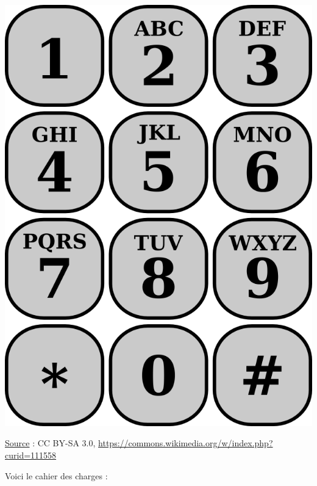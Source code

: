 \documentclass[a4paper, french, 12pt]{article}  %
\begin{document}
\begin{center}
\includegraphics[scale=0.15]{images/Telephone-keypad.png}

\uline{Source} : CC BY-SA 3.0, \url{https://commons.wikimedia.org/w/index.php?curid=111558}
\end{center}

Voici le cahier des charges :
\end{document}
